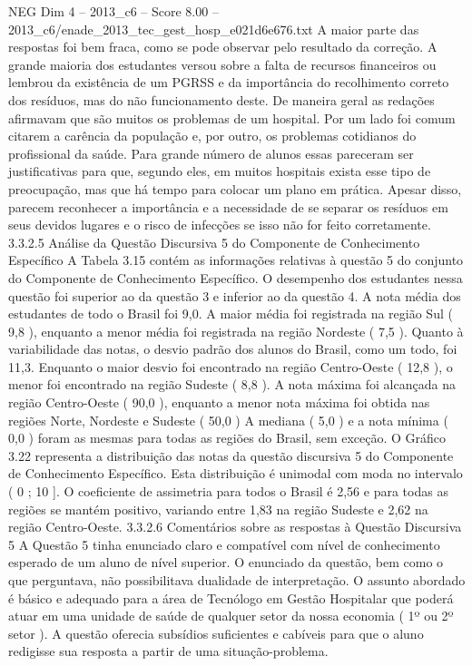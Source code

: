 \begin{textsample}{NEG Dim 4 – 2013\_c6 – Score 8.00 – 2013\_c6/enade\_2013\_tec\_gest\_hosp\_e021d6e676.txt}
A maior parte das respostas foi bem fraca, como se pode observar pelo resultado da correção.
A grande maioria dos estudantes versou sobre a falta de recursos financeiros ou lembrou da existência de um PGRSS e da importância do recolhimento correto dos resíduos, mas do não funcionamento deste.
De maneira geral as redações afirmavam que são muitos os problemas de um hospital.
Por um lado foi comum citarem a carência da população e, por outro, os problemas cotidianos do profissional da saúde.
Para grande número de alunos essas pareceram ser justificativas para que, segundo eles, em muitos hospitais exista esse tipo de preocupação, mas que há tempo para colocar um plano em prática.
Apesar disso, parecem reconhecer a importância e a necessidade de se separar os resíduos em seus devidos lugares e o risco de infecções se isso não for feito corretamente. 3.3.2.5 Análise da Questão Discursiva 5 do Componente de Conhecimento Específico A Tabela 3.15 contém as informações relativas à questão 5 do conjunto do Componente de Conhecimento Específico.
O desempenho dos estudantes nessa questão foi superior ao da questão 3 e inferior ao da questão 4.
A nota média dos estudantes de todo o Brasil foi 9,0.
A maior média foi registrada na região Sul ( 9,8 ), enquanto a menor média foi registrada na região Nordeste ( 7,5 ).
Quanto à variabilidade das notas, o desvio padrão dos alunos do Brasil, como um todo, foi 11,3.
Enquanto o maior desvio foi encontrado na região Centro-Oeste ( 12,8 ), o menor foi encontrado na região Sudeste ( 8,8 ).
A nota máxima foi alcançada na região Centro-Oeste ( 90,0 ), enquanto a menor nota máxima foi obtida nas regiões Norte, Nordeste e Sudeste ( 50,0 ) A mediana ( 5,0 ) e a nota mínima ( 0,0 ) foram as mesmas para todas as regiões do Brasil, sem exceção.
O Gráfico 3.22 representa a distribuição das notas da questão discursiva 5 do Componente de Conhecimento Específico.
Esta distribuição é unimodal com moda no intervalo ( 0 ; 10 ].
O coeficiente de assimetria para todos o Brasil é 2,56 e para todas as regiões se mantém positivo, variando entre 1,83 na região Sudeste e 2,62 na região Centro-Oeste. 3.3.2.6 Comentários sobre as respostas à Questão Discursiva 5 A Questão 5 tinha enunciado claro e compatível com nível de conhecimento esperado de um aluno de nível superior.
O enunciado da questão, bem como o que perguntava, não possibilitava dualidade de interpretação.
O assunto abordado é básico e adequado para a área de Tecnólogo em Gestão Hospitalar que poderá atuar em uma unidade de saúde de qualquer setor da nossa economia ( 1º ou 2º setor ).
A questão oferecia subsídios suficientes e cabíveis para que o aluno redigisse sua resposta a partir de uma situação-problema.

\end{textsample}
